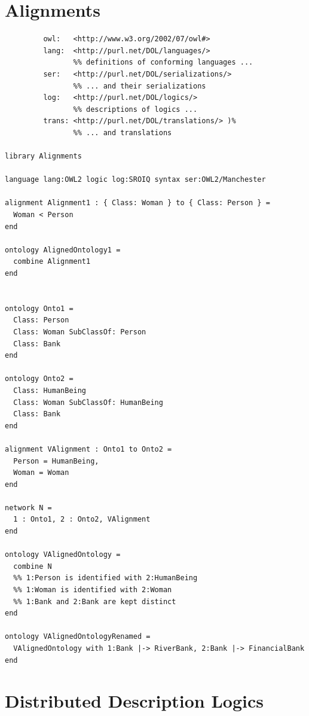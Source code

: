 \documentclass[10pt,fleqn,final]{scrreprt}
\newcommand{\sclause}[1]{\section{#1}}
\begin{document}
\sclause{Alignments}\label{ex:alignment}
\begin{lstlisting}[basicstyle=\ttfamily,language=dolText,alsolanguage=OWL2manchester,escapechar=@,mathescape]
%prefix( :      <http://www.example.org/@alignment@#>
         owl:   <http://www.w3.org/2002/07/owl#>
         lang:  <http://purl.net/DOL/languages/>
                %% definitions of conforming languages ...
         ser:   <http://purl.net/DOL/serializations/>
                %% ... and their serializations
         log:   <http://purl.net/DOL/logics/>
                %% descriptions of logics ...
         trans: <http://purl.net/DOL/translations/> )%
                %% ... and translations

library Alignments

language lang:OWL2 logic log:SROIQ syntax ser:OWL2/Manchester

alignment Alignment1 : { Class: Woman } to { Class: Person } =
  Woman < Person
end

ontology AlignedOntology1 =
  combine Alignment1
end


ontology Onto1 =
  Class: Person
  Class: Woman SubClassOf: Person
  Class: Bank
end

ontology Onto2 =
  Class: HumanBeing
  Class: Woman SubClassOf: HumanBeing
  Class: Bank
end

alignment VAlignment : Onto1 to Onto2 =
  Person = HumanBeing,
  Woman = Woman
end

network N =
  1 : Onto1, 2 : Onto2, VAlignment
end
 
ontology VAlignedOntology =
  combine N
  %% 1:Person is identified with 2:HumanBeing
  %% 1:Woman is identified with 2:Woman
  %% 1:Bank and 2:Bank are kept distinct
end

ontology VAlignedOntologyRenamed =
  VAlignedOntology with 1:Bank |-> RiverBank, 2:Bank |-> FinancialBank
end

\end{lstlisting}


\sclause{Distributed Description Logics}\label{ex:DDL}
\end{document}
